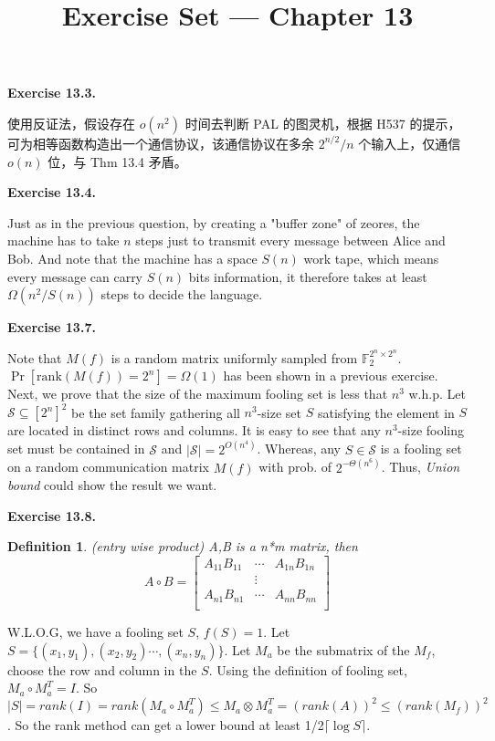 \documentclass[a4paper]{article}
\title{Exercise Set --- Chapter 13}
\date{}
\newtheorem{definition}{Definition}
\newenvironment{exercise}[1]{
	\par
	\noindent\textbf{Exercise #1.}\quad
}{
	\par
	\bigskip
}
\begin{document}
    \maketitle


	\begin{exercise}{13.3}
		使用反证法，假设存在 $o(n^2)$ 时间去判断 PAL 的图灵机，根据 H537 的提示，可为相等函数构造出一个通信协议，该通信协议在多余 $2^{n/2}/n$ 个输入上，仅通信 $o(n)$ 位，与 Thm 13.4 矛盾。	
	\end{exercise}

    \begin{exercise}{13.4}
    Just as in the previous question, by creating a "buffer zone" of zeores, the machine has to take $n$ steps just to transmit every message between Alice and Bob. And note that the machine has a space $S(n)$ work tape, which means every message can carry $S(n)$ bits information, it therefore takes at least $\Omega(n^2 / S(n))$ steps to decide the language.   
    \end{exercise}

    \begin{exercise}{13.7}
    	Note that $M(f)$ is a random matrix uniformly sampled from $\mathbb F_2^{2^n\times 2^n}$. $\Pr[\text{rank}(M(f)) = 2^n] = \Omega(1)$ has been shown in a previous exercise. Next, we prove that the size of the maximum fooling set is less that $n^3$ w.h.p. Let $\mathcal S \subseteq [2^n]^2$ be the set family gathering all $n^3$-size set $S$ satisfying the element in $S$ are located in distinct rows and columns. It is easy to see that any $n^3$-size fooling set must be contained in $\mathcal S$ and $|\mathcal S| = 2^{O(n^4)}$. Whereas, any $S \in \mathcal S$ is a fooling set on a random communication matrix $M(f)$ with prob. of $2^{-\Theta(n^6)}$. Thus, \emph{Union bound} could show the result we want.
    \end{exercise}

    \begin{exercise}{13.8}
	    \begin {definition}(entry wise product)
	        A,B is a n*m matrix, then 
	        $$A\circ B=\begin{bmatrix} 
	   	A_{11}B_{11} &\cdots  & A_{1n}B_{1n} \\
	        &\vdots&\\
	   	A_{n1}B_{n1} & \cdots&A_{nn}B_{nn}\\
	   	\end{bmatrix}	$$
	    \end{definition}
	    W.L.O.G, we have a fooling set $S$, $f(S) = 1$. Let $S = \{(x_1,y_1),(x_2,y_2)\cdots,(x_n,y_n)\}$. Let $M_a$ be the submatrix of the $M_f$, choose the row and column in the $S$. Using the definition of  fooling set, $M_a \circ M_a^T = I$. So $|S| = rank(I) = rank(M_a \circ M_a^T) \le M_a \otimes M_a^T = (rank(A))^2 \le (rank(M_f))^2$. So the rank method can get a lower bound at least 1/2$\lceil \log S \rceil$.
	\end{exercise}
\end{document}
